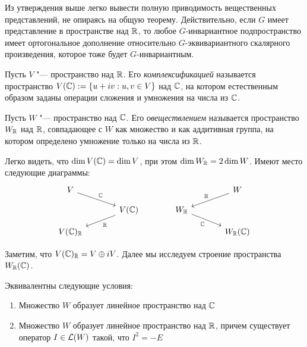 \begin{note}
	Из утверждения выше легко вывести полную приводимость вещественных представлений, не опираясь на общую теорему. Действительно, если $G$ имеет представление в пространстве над $\mathbb{R}$, то любое $G$-инвариантное подпространство имеет ортогональное дополнение относительно $G$-эквивариантного скалярного произведения, которое тоже будет $G$-инвариантным.
\end{note}

\begin{definition}
	Пусть $V$ "--- пространство над $\mathbb{R}$. Его \textit{комплексификацией} называется пространство $V(\mathbb{C}) := \{u + iv : u, v \in V\}$ над $\mathbb{C}$, на котором естественным образом заданы операции сложения и умножения на числа из $\mathbb{C}$.
\end{definition}

\begin{definition}
	Пусть $W$ "--- пространство над $\mathbb{C}$. Его \textit{овеществлением} называется пространство $W_{\mathbb{R}}$ над $\mathbb{R}$, совпадающее с $W$ как множество и как аддитивная группа, на котором определено умножение только на числа из $\mathbb{R}$.
\end{definition}

\begin{note}
	Легко видеть, что $\dim{V(\mathbb{C})} = \dim{V}$, при этом $\dim{W_{\mathbb{R}}} = 2\dim{W}$. Имеют место следующие диаграммы:
	\[
	\begin{tikzcd}[
		row sep = small,
		column sep = large
		]
		V \arrow{dr}{\Cm} &  & & \arrow[swap]{dl}{\R} W\\
		 & \arrow{dl}{\R} V(\Cm) & W_\R \arrow[swap]{dr}{\Cm} & \\
		V(\Cm)_\R & & & W_\R(\Cm)
	\end{tikzcd}
	\]
	
	Заметим, что $V(\mathbb{C})_{\mathbb{R}} = V \oplus iV$. Далее мы исследуем строение пространства $W_{\mathbb{R}}(\mathbb{C})$.
\end{note}

\begin{proposition}
	Эквивалентны следующие условия:
	\begin{enumerate}
		\item Множество $W$ образует линейное пространство над $\mathbb{C}$
		\item Множество $W$ образует линейное пространство над $\mathbb{R}$, причем существует оператор $I \in \mathcal L(W)$ такой, что $I^2 = -E$
	\end{enumerate}
\end{proposition}

